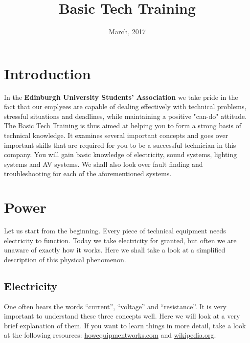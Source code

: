 \documentclass[14pt]{article} %
\title{\huge {\textbf{Basic Tech Training}}} %
\date{March, 2017}
\begin{document}
\begin{@twocolumnfalse}
\maketitle


 \end{@twocolumnfalse}


\section{Introduction}
\label{intro}
In the \textbf{Edinburgh University Students' Association} we take pride in the fact that our emplyees are capable of dealing effectively with technical problems, stressful situations and deadlines, while maintaining a positive "can-do" attitude.
The Basic Tech Training is thus aimed at helping you to form a strong basis of technical knowledge. It examines several important concepts and goes over important skills that are required for you to be a successful technician in this company. You will gain basic knowledge of electricity, sound systems, lighting systems and AV systems. We shall also look over fault finding and troubleshooting for each of the aforementioned systems.


\section{Power}
\label{power}

Let us start from the beginning. Every piece of technical equipment needs electricity to function. Today we take electricity for granted, but often we are unaware of exactly how it works. Here we shall take a look at a simplified description of this physical phenomenon. 

\subsection{Electricity}
\label{electricity}
One often hears the words “current”, “voltage” and “resistance”. It is very important to understand these three concepts well. Here we will look at a very brief explanation of them. If you want to learn things in more detail, take a look at the following resources: \href{https://www.howequipmentworks.com/electricity_basics/}{howequipmentworks.com} and \href{https://en.wikipedia.org/wiki/Electricity#Electric_charge}{wikipedia.org}.
\end{document}
